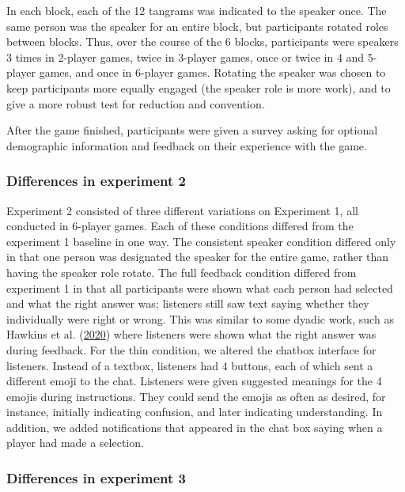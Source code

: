 \documentclass[
  english,
  a4paper,
]{article}
\begin{document}
In each block, each of the 12 tangrams was indicated to the speaker once. The same person was the speaker for an entire block, but participants rotated roles between blocks. Thus, over the course of the 6 blocks, participants were speakers 3 times in 2-player games, twice in 3-player games, once or twice in 4 and 5-player games, and once in 6-player games. Rotating the speaker was chosen to keep participants more equally engaged (the speaker role is more work), and to give a more robust test for reduction and convention.

After the game finished, participants were given a survey asking for optional demographic information and feedback on their experience with the game.

\hypertarget{differences-in-experiment-2}{%
\subsubsection{Differences in experiment 2}\label{differences-in-experiment-2}}

Experiment 2 consisted of three different variations on Experiment 1, all conducted in 6-player games. Each of these conditions differed from the experiment 1 baseline in one way. The consistent speaker condition differed only in that one person was designated the speaker for the entire game, rather than having the speaker role rotate. The full feedback condition differed from experiment 1 in that all participants were shown what each person had selected and what the right answer was; listeners still saw text saying whether they individually were right or wrong. This was similar to some dyadic work, such as Hawkins et al. (\protect\hyperlink{ref-hawkins2020}{2020}) where listeners were shown what the right answer was during feedback. For the thin condition, we altered the chatbox interface for listeners. Instead of a textbox, listeners had 4 buttons, each of which sent a different emoji to the chat. Listeners were given suggested meanings for the 4 emojis during instructions. They could send the emojis as often as desired, for instance, initially indicating confusion, and later indicating understanding. In addition, we added notifications that appeared in the chat box saying when a player had made a selection.

\hypertarget{differences-in-experiment-3}{%
\subsubsection{Differences in experiment 3}\label{differences-in-experiment-3}}
\end{document}
